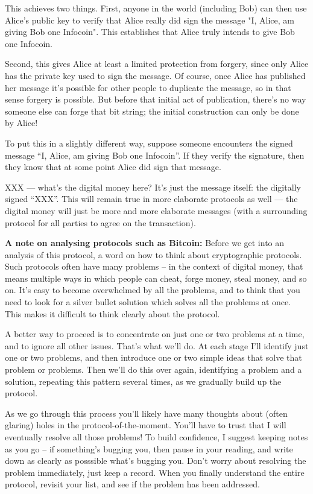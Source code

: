 \documentclass[12pt]{book}
\newcounter{problem}[chapter]
\begin{document}
This achieves two things.  First, anyone in the world (including Bob)
can then use Alice's public key to verify that Alice really did sign
the message "I, Alice, am giving Bob one Infocoin".  This establishes
that Alice truly intends to give Bob one Infocoin.

Second, this gives Alice at least a limited protection from forgery,
since only Alice has the private key used to sign the message.  Of
course, once Alice has published her message it's possible for other
people to duplicate the message, so in that sense forgery is possible.
But before that initial act of publication, there's no way someone
else can forge that bit string; the initial construction can only be
done by Alice!  

To put this in a slightly different way, suppose someone encounters
the signed message ``I, Alice, am giving Bob one Infocoin''.  If they
verify the signature, then they know that at some point Alice did sign
that message.

XXX --- what's the digital money here?  It's just the message itself:
the digitally signed ``XXX''.  This will remain true in more elaborate
protocols as well --- the digital money will just be more and more
elaborate messages (with a surrounding protocol for all parties to
agree on the transaction).

\textbf{A note on analysing protocols such as Bitcoin:} Before we get
into an analysis of this protocol, a word on how to think about
cryptographic protocols.  Such protocols often have many problems --
in the context of digital money, that means multiple ways in which
people can cheat, forge money, steal money, and so on.  It's easy to
become overwhelmed by all the problems, and to think that you need to
look for a silver bullet solution which solves all the problems at
once.  This makes it difficult to think clearly about the protocol.

A better way to proceed is to concentrate on just one or two problems
at a time, and to ignore all other issues.  That's what we'll do.  At
each stage I'll identify just one or two problems, and then introduce
one or two simple ideas that solve that problem or problems.  Then
we'll do this over again, identifying a problem and a solution,
repeating this pattern several times, as we gradually build up the
protocol.

As we go through this process you'll likely have many thoughts about
(often glaring) holes in the protocol-of-the-moment.  You'll have to
trust that I will eventually resolve all those problems!  To build
confidence, I suggest keeping notes as you go -- if something's
bugging you, then pause in your reading, and write down as clearly as
posssible what's bugging you.  Don't worry about resolving the problem
immediately, just keep a record.  When you finally understand the
entire protocol, revisit your list, and see if the problem has been
addressed.
\end{document}
